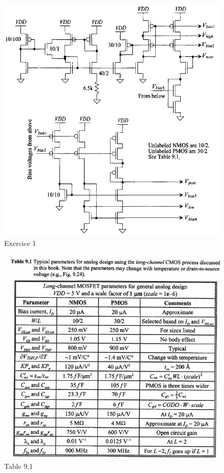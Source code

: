 \documentclass[paper=a4, fontsize=11pt]{article} %
\numberwithin{equation}{section} %
\numberwithin{figure}{section} %
\numberwithin{table}{section} %
\begin{document}
\begin{figure}[!htbp]
   \centering
   \includegraphics[width=18cm]{figure/fig10-3-bis.png}
   \caption{Exercice 1}
   \label{fig10-3}
\end{figure}
\newpage

\begin{figure}[!htbp]
   \centering
   \includegraphics[width=18cm]{figure/table9-1.png}
   \caption{Table 9.1}
   \label{table9-1}
\end{figure}
\end{document}
